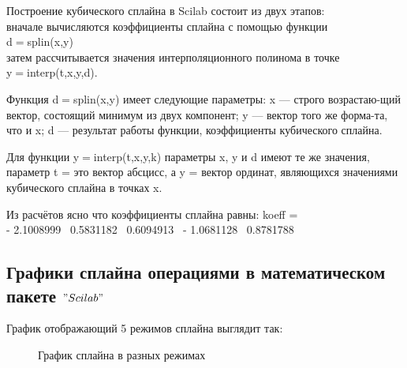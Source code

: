 \documentclass[russian,utf8,nocolumnxxxi,nocolumnxxxii]{eskdtext}
\begin{document}
Построение кубического сплайна в Scilab состоит из двух этапов:\\ вначале вычисляются коэффициенты сплайна с помощью функции\\ d$=$splin(x,y)\\

затем рассчитывается значения интерполяционного полинома в точке\\ y$=$interp(t,x,y,d).

Функция d$=$splin(x,y) имеет следующие параметры: x — строго возрастаю-щий вектор, состоящий минимум из двух компонент; y — вектор того же форма-та, что и x; d — результат работы функции, коэффициенты кубического сплайна.

Для функции y$=$interp(t,x,y,k) параметры x, y и d имеют те же значения,
параметр t = это вектор абсцисс, а y = вектор ординат, являющихся значениями
кубического сплайна в точках x.

Из расчётов ясно что коэффициенты сплайна равны:
koeff  =\\

  - 2.1008999 \   0.5831182  \  0.6094913 \ - 1.0681128 \   0.8781788 \\
  \newpage
\subsection{Графики сплайна операциями в математическом пакете $"Scilab"$}
    

График отображающий 5 режимов сплайна выглядит так:
\begin{figure}[h!]
\caption*{График сплайна в разных режимах}
\end{figure}

\newpage
\end{document}

